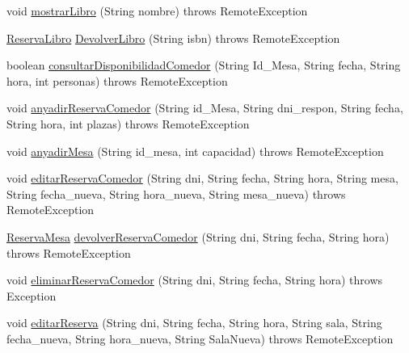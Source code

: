 \begin{DoxyCompactItemize}
\item 
void \mbox{\hyperlink{classes_1_1deusto_1_1spq_1_1biblioteca_1_1remote_1_1_biblioteca_a6455f223a57806146e77149429caf6db}{mostrar\+Libro}} (String nombre)  throws Remote\+Exception 
\item 
\mbox{\hyperlink{classes_1_1deusto_1_1spq_1_1biblioteca_1_1data_1_1_reserva_libro}{Reserva\+Libro}} \mbox{\hyperlink{classes_1_1deusto_1_1spq_1_1biblioteca_1_1remote_1_1_biblioteca_a739d23f2912d2f102eadf6e90c12ab61}{Devolver\+Libro}} (String isbn)  throws Remote\+Exception 
\item 
boolean \mbox{\hyperlink{classes_1_1deusto_1_1spq_1_1biblioteca_1_1remote_1_1_biblioteca_af524e01768fc8aef0d3b3efd01f5c99f}{consultar\+Disponibilidad\+Comedor}} (String Id\+\_\+\+Mesa, String fecha, String hora, int personas)  throws Remote\+Exception 
\item 
void \mbox{\hyperlink{classes_1_1deusto_1_1spq_1_1biblioteca_1_1remote_1_1_biblioteca_ad02d14595454dd0b8e8ef7db97b673f6}{anyadir\+Reserva\+Comedor}} (String id\+\_\+\+Mesa, String dni\+\_\+respon, String fecha, String hora, int plazas)  throws Remote\+Exception 
\item 
void \mbox{\hyperlink{classes_1_1deusto_1_1spq_1_1biblioteca_1_1remote_1_1_biblioteca_a5cfc021da6e151681f153a974177d2e7}{anyadir\+Mesa}} (String id\+\_\+mesa, int capacidad)  throws Remote\+Exception 
\item 
void \mbox{\hyperlink{classes_1_1deusto_1_1spq_1_1biblioteca_1_1remote_1_1_biblioteca_a51fa3f46456f63c8e2e903359ab0a482}{editar\+Reserva\+Comedor}} (String dni, String fecha, String hora, String mesa, String fecha\+\_\+nueva, String hora\+\_\+nueva, String mesa\+\_\+nueva)  throws Remote\+Exception 
\item 
\mbox{\hyperlink{classes_1_1deusto_1_1spq_1_1biblioteca_1_1data_1_1_reserva_mesa}{Reserva\+Mesa}} \mbox{\hyperlink{classes_1_1deusto_1_1spq_1_1biblioteca_1_1remote_1_1_biblioteca_a42f0baaeb77d185634a84f10936e8f8e}{devolver\+Reserva\+Comedor}} (String dni, String fecha, String hora)  throws Remote\+Exception 
\item 
void \mbox{\hyperlink{classes_1_1deusto_1_1spq_1_1biblioteca_1_1remote_1_1_biblioteca_a83e80de66b9deeec2c025a8443df515a}{eliminar\+Reserva\+Comedor}} (String dni, String fecha, String hora)  throws Exception 
\item 
void \mbox{\hyperlink{classes_1_1deusto_1_1spq_1_1biblioteca_1_1remote_1_1_biblioteca_a33f2a58e9d6cea4181608d233bfcb158}{editar\+Reserva}} (String dni, String fecha, String hora, String sala, String fecha\+\_\+nueva, String hora\+\_\+nueva, String Sala\+Nueva)  throws Remote\+Exception 

\end{DoxyCompactItemize}
